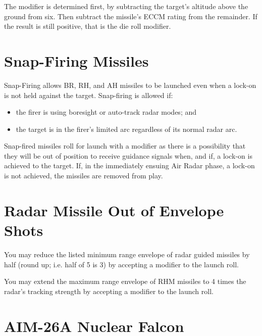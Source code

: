 The modifier is determined first, by subtracting the target's altitude above the ground from six. Then subtract the missile's ECCM rating from the remainder. If the result is still positive, that is the die roll modifier.



\begin{advancedrules}

\section{Snap-Firing Missiles}
\label{rule:snap-firing-missiles}

Snap-Firing allows BR, RH, and AH missiles to be launched even when a lock-on is not held against the target. Snap-firing is allowed if:

\begin{itemize}
    \item the firer is using boresight or auto-track radar modes; and
    \item the target is in the firer's limited arc regardless of its normal radar arc.
\end{itemize}

Snap-fired missiles roll for launch with a  modifier as there is a possibility that they will be out of position to receive guidance signals when, and if, a lock-on is achieved to the target. If, in the immediately ensuing Air Radar phase, a lock-on is not achieved, the missiles are removed from play.

\section{Radar Missile Out of Envelope Shots}
\label{rule:radar-out-of-envelope-launches}

You may reduce the listed minimum range envelope of radar guided missiles by half (round up; i.e. half of 5 is 3) by accepting a  modifier to the launch roll.

You may extend the maximum range envelope of RHM missiles to 4 times the radar's tracking strength by accepting a  modifier to the launch roll.

\section{AIM-26A Nuclear Falcon}


\end{advancedrules}

